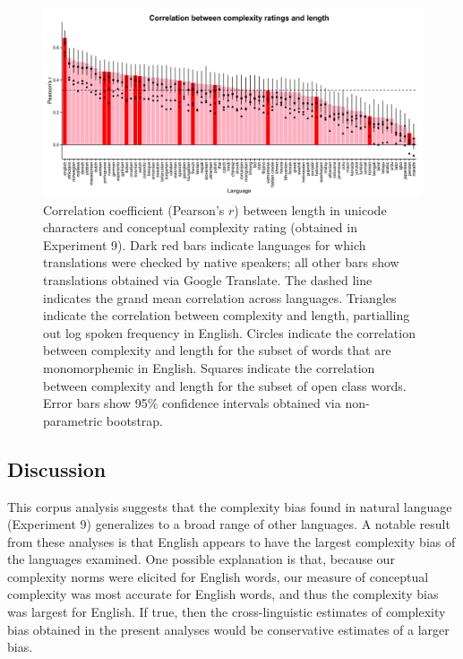  \begin{figure}
 \begin{center}
  \includegraphics[width=6.3in]{figs/xling_plot.png}
  \caption{\label{fig:study4a_plasd} Correlation coefficient (Pearson's $r$) between length in unicode characters and conceptual complexity rating (obtained in Experiment 9). Dark red bars indicate languages for which translations were checked by native speakers; all other bars show translations obtained via Google Translate. The dashed line indicates the grand mean correlation across languages. Triangles indicate the correlation between complexity and length, partialling out log spoken frequency in English. Circles indicate the correlation between complexity and length for the subset of words that are monomorphemic in English. Squares indicate the correlation between complexity and length for the subset of open class words. Error bars show 95\% confidence intervals obtained via non-parametric bootstrap. }
 \end{center}
\end{figure}


\subsection{Discussion}

This corpus analysis suggests that the complexity bias found in natural language (Experiment 9) generalizes to a broad range of other languages. A notable result from these analyses is that English appears to have the largest complexity bias of the languages examined. One possible explanation is that, because our complexity norms were elicited for English words, our measure of conceptual complexity was most accurate for English words, and thus the complexity bias was largest for English. If true, then the cross-linguistic estimates of complexity bias obtained in the present analyses would be conservative estimates of a larger bias.



